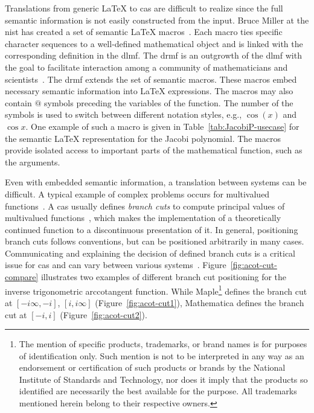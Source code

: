 \documentclass[a4paper,11pt]{article}
\newcommand{\Maple}{Maple}
\newcommand{\Mathematica}{Mathematica}
\theoremstyle{defTheoStyle}
\theoremstyle{defExampStyle}
\DeclareRobustCommand{\iunit}{{i}}
\begin{document}
Translations from generic \LaTeX{} to \gls*{cas} are difficult to realize since the full semantic information is not easily constructed from the input. Bruce Miller at the \gls*{nist} has created a set of semantic \LaTeX{} macros~\parencite{DLMF:Macros}. Each macro ties specific character sequences to a well-defined mathematical object and is linked with the corresponding definition in the \gls*{dlmf}. The \gls*{drmf} is an outgrowth of the \gls*{dlmf} with the goal to facilitate interaction among a community of mathematicians and scientists~\parencites{DRMF:14}{DRMF:15}. The \gls*{drmf} extends the set of semantic macros. These macros embed necessary semantic information into \LaTeX{} expressions. The macros may also contain $@$ symbols preceding the variables of the function. The number of the symbols is used to switch between different notation styles, e.g., $\cos(x)$ and $\cos x$. One example of such a macro is given in Table~\ref{tab:JacobiP-usecase} for the semantic \LaTeX{} representation for the Jacobi polynomial. The macros provide isolated access to important parts of the mathematical function, such as the arguments. 

Even with embedded semantic information, a translation between systems can be difficult. A typical example of complex problems occurs for multivalued functions~\parencite{AISC:MultivaluedFunctions}. A \gls*{cas} usually defines \textit{branch cuts} to compute principal values of multivalued functions~\parencite{Maple:Cuts}, which makes the implementation of a theoretically continued function to a discontinuous presentation of it. In general, positioning branch cuts follows conventions, but can be positioned arbitrarily in many cases. Communicating and explaining the decision of defined branch cuts is a critical issue for \gls*{cas} and can vary between various systems~\parencite{Branches:acot}. Figure~\ref{fig:acot-cut-compare} illustrates two examples of different branch cut positioning for the inverse trigonometric arccotangent function. While \Maple{}\footnote{The mention of
specific products, trademarks, or brand
names is for purposes of identification only. Such mention is not to be interpreted
in any way as an endorsement or certification of such products or brands by the
National Institute of Standards and Technology, nor does it imply that the products
so identified are necessarily the best available for the purpose. All trademarks
mentioned herein belong to their respective owners.} defines the branch cut at ${[-\iunit\infty, -\iunit]}$, ${[\iunit,\iunit\infty]}$ (Figure~\ref{fig:acot-cut1}), \Mathematica{} defines the branch cut at ${[-\iunit, \iunit]}$ (Figure~\ref{fig:acot-cut2}).
\end{document}
